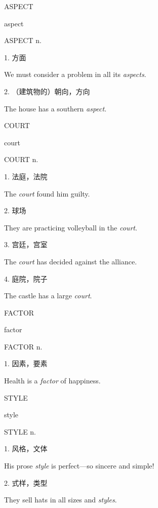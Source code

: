 \begin{flashcard}{
ASPECT

aspect
}
\begin{center}
ASPECT n. 
\end{center}
1. 方面

We must consider a problem in all its \textit{aspects}.

2. （建筑物的）朝向，方向

The house has a southern \textit{aspect}.

\end{flashcard}
\begin{flashcard}{
COURT

court
}
\begin{center}
COURT n. 
\end{center}
1. 法庭，法院

The \textit{court} found him guilty.

2. 球场

They are practicing volleyball in the \textit{court}.

3. 宫廷，宫室

The \textit{court} has decided against the alliance.

4. 庭院，院子

The castle has a large \textit{court}.

\end{flashcard}
\begin{flashcard}{
FACTOR

factor
}
\begin{center}
FACTOR n. 
\end{center}
1. 因素，要素

Health is a \textit{factor} of happiness.

\end{flashcard}
\begin{flashcard}{
STYLE

style
}
\begin{center}
STYLE n. \textipa{[stail]}
\end{center}
1. 风格，文体

His prose \textit{style} is perfect---so sincere and simple!

2. 式样，类型

They sell hats in all sizes and \textit{styles}.

\end{flashcard}

